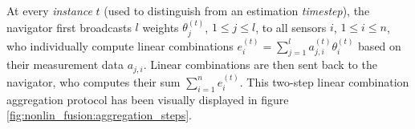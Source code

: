 At every \textit{instance} $t$ (used to distinguish from an estimation \textit{timestep}), the navigator first broadcasts $l$ weights $\theta_j^{(t)}$, $1\leq j\leq l$, to all sensors $i$, $1\leq i \leq n$, who individually compute linear combinations $e^{(t)}_i=\sum^l_{j=1}a_{j,i}^{(t)}\theta_i^{(t)}$ based on their measurement data $a_{j,i}$. Linear combinations are then sent back to the navigator, who computes their sum $\sum^n_{i=1}e^{(t)}_{i}$. This two-step linear combination aggregation protocol has been visually displayed in figure \ref{fig:nonlin_fusion:aggregation_steps}.
\begin{figure}[htbp]
\begin{subfigure}[htbp]{\textwidth}
    \centering
    \vspace{\baselineskip}
\end{subfigure}
\end{figure}
